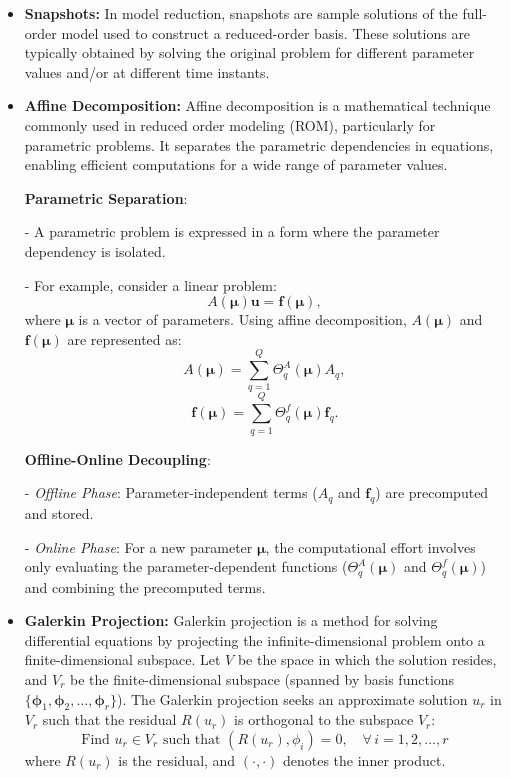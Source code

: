 \documentclass[11pt]{article}
\begin{document}
\begin{itemize}
                    \item \textbf{Snapshots:} In model reduction, snapshots are sample solutions of the full-order model used to construct a reduced-order basis. These solutions are typically obtained by solving the original problem for different parameter values and/or at different time instants.

                    \item \textbf{Affine Decomposition:} Affine decomposition is a mathematical technique commonly used in reduced order modeling (ROM), particularly for parametric problems. It separates the parametric dependencies in equations, enabling efficient computations for a wide range of parameter values.

                    \textbf{Parametric Separation}:

                       - A parametric problem is expressed in a form where the parameter dependency is isolated.

                       - For example, consider a linear problem:
                         \[
                         A(\boldsymbol{\mu}) \mathbf{u} = \mathbf{f}(\boldsymbol{\mu}),
                         \]
                         where \(\boldsymbol{\mu}\) is a vector of parameters. Using affine decomposition, \(A(\boldsymbol{\mu})\) and \(\mathbf{f}(\boldsymbol{\mu})\) are represented as:
                         \[
                         A(\boldsymbol{\mu}) = \sum_{q=1}^Q \Theta_q^A(\boldsymbol{\mu}) A_q,
                         \]
                         \[
                         \mathbf{f}(\boldsymbol{\mu}) = \sum_{q=1}^Q \Theta_q^f(\boldsymbol{\mu}) \mathbf{f}_q.
                         \]

                    \textbf{Offline-Online Decoupling}:

                       - \textit{Offline Phase}: Parameter-independent terms (\(A_q\) and \(\mathbf{f}_q\)) are precomputed and stored.

                       - \textit{Online Phase}: For a new parameter \(\boldsymbol{\mu}\), the computational effort involves only evaluating the parameter-dependent functions (\(\Theta_q^A(\boldsymbol{\mu})\) and \(\Theta_q^f(\boldsymbol{\mu})\)) and combining the precomputed terms.

                    \item \textbf{Galerkin Projection:} Galerkin projection is a method for solving differential equations by projecting the infinite-dimensional problem onto a finite-dimensional subspace. Let \( V \) be the space in which the solution resides, and \( V_r \) be the finite-dimensional subspace (spanned by basis functions \( \{ \boldsymbol\phi_1, \boldsymbol\phi_2, \ldots, \boldsymbol\phi_r \} \)). The Galerkin projection seeks an approximate solution \( u_r \) in \( V_r \) such that the residual \( R(u_r) \) is orthogonal to the subspace \( V_r \):
                    \[
                    \text{Find } u_r \in V_r \text{ such that } \left( R(u_r), \phi_i \right) = 0, \quad \forall \, i = 1, 2, \ldots, r
                    \]
                    where \( R(u_r) \) is the residual, and \( \left( \cdot, \cdot \right) \) denotes the inner product.


\end{itemize}
\end{document}

